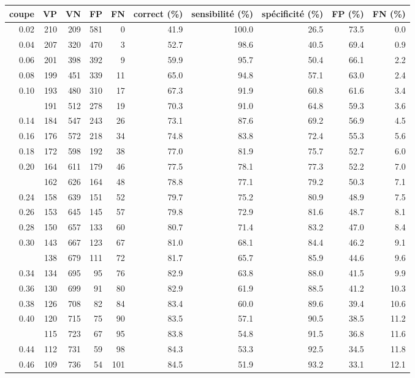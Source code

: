 \documentclass[
  11pt,
  letterpaper,
]{book}
\theoremstyle{definition}
\theoremstyle{definition}
\theoremstyle{definition}
\theoremstyle{remark}
\begin{document}
\begin{longtable}{rrrrrrrrrr}
\toprule
coupe & VP & VN & FP & FN & correct (\%) & sensibilité (\%) & spécificité (\%) & FP (\%) & FN (\%)\\
\midrule
0.02 & 210 & 209 & 581 & 0 & 41.9 & 100.0 & 26.5 & 73.5 & 0.0\\
0.04 & 207 & 320 & 470 & 3 & 52.7 & 98.6 & 40.5 & 69.4 & 0.9\\
0.06 & 201 & 398 & 392 & 9 & 59.9 & 95.7 & 50.4 & 66.1 & 2.2\\
0.08 & 199 & 451 & 339 & 11 & 65.0 & 94.8 & 57.1 & 63.0 & 2.4\\
0.10 & 193 & 480 & 310 & 17 & 67.3 & 91.9 & 60.8 & 61.6 & 3.4\\
\addlinespace
0.12 & 191 & 512 & 278 & 19 & 70.3 & 91.0 & 64.8 & 59.3 & 3.6\\
0.14 & 184 & 547 & 243 & 26 & 73.1 & 87.6 & 69.2 & 56.9 & 4.5\\
0.16 & 176 & 572 & 218 & 34 & 74.8 & 83.8 & 72.4 & 55.3 & 5.6\\
0.18 & 172 & 598 & 192 & 38 & 77.0 & 81.9 & 75.7 & 52.7 & 6.0\\
0.20 & 164 & 611 & 179 & 46 & 77.5 & 78.1 & 77.3 & 52.2 & 7.0\\
\addlinespace
0.22 & 162 & 626 & 164 & 48 & 78.8 & 77.1 & 79.2 & 50.3 & 7.1\\
0.24 & 158 & 639 & 151 & 52 & 79.7 & 75.2 & 80.9 & 48.9 & 7.5\\
0.26 & 153 & 645 & 145 & 57 & 79.8 & 72.9 & 81.6 & 48.7 & 8.1\\
0.28 & 150 & 657 & 133 & 60 & 80.7 & 71.4 & 83.2 & 47.0 & 8.4\\
0.30 & 143 & 667 & 123 & 67 & 81.0 & 68.1 & 84.4 & 46.2 & 9.1\\
\addlinespace
0.32 & 138 & 679 & 111 & 72 & 81.7 & 65.7 & 85.9 & 44.6 & 9.6\\
0.34 & 134 & 695 & 95 & 76 & 82.9 & 63.8 & 88.0 & 41.5 & 9.9\\
0.36 & 130 & 699 & 91 & 80 & 82.9 & 61.9 & 88.5 & 41.2 & 10.3\\
0.38 & 126 & 708 & 82 & 84 & 83.4 & 60.0 & 89.6 & 39.4 & 10.6\\
0.40 & 120 & 715 & 75 & 90 & 83.5 & 57.1 & 90.5 & 38.5 & 11.2\\
\addlinespace
0.42 & 115 & 723 & 67 & 95 & 83.8 & 54.8 & 91.5 & 36.8 & 11.6\\
0.44 & 112 & 731 & 59 & 98 & 84.3 & 53.3 & 92.5 & 34.5 & 11.8\\
0.46 & 109 & 736 & 54 & 101 & 84.5 & 51.9 & 93.2 & 33.1 & 12.1\\

\end{longtable}
\end{document}
